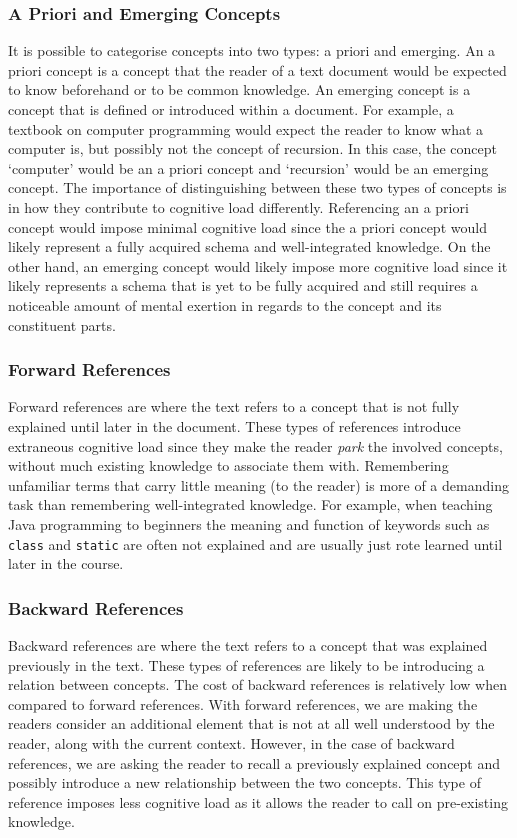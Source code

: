 \documentclass[12pt]{article}
\theoremstyle{grammarstyle}
\begin{document}
\subsubsection{A Priori and Emerging Concepts}
It is possible to categorise concepts into two types: a priori and emerging.
An a priori concept is a concept that the reader of a text document would be expected to know beforehand or to be common knowledge.
An emerging concept is a concept that is defined or introduced within a document.
For example, a textbook on computer programming would expect the reader to know what a computer is, but possibly not the concept of recursion. In this case, the concept `computer' would be an a priori concept and `recursion' would be an emerging concept.
The importance of distinguishing between these two types of concepts is in how they contribute to cognitive load differently. Referencing an a priori concept would impose minimal cognitive load since the a priori concept would likely represent a fully acquired schema and well-integrated knowledge. On the other hand, an emerging concept would likely impose more cognitive load since it likely represents a schema that is yet to be fully acquired and still requires a noticeable amount of mental exertion in regards to the concept and its constituent parts.

\subsubsection{Forward References}
Forward references are where the text refers to a concept that is not fully explained until later in the document. These types of references introduce extraneous cognitive load since they make the reader \textit{park} the involved concepts, without much existing knowledge to associate them with. Remembering unfamiliar terms that carry little meaning (to the reader) is more of a demanding task than remembering well-integrated knowledge. For example, when teaching Java programming to beginners the meaning and function of keywords such as \texttt{class} and \texttt{static} are often not explained and are usually just rote learned until later in the course.

\subsubsection{Backward References}
Backward references are where the text refers to a concept that was explained previously in the text. These types of references are likely to be introducing a relation between concepts. The cost of backward references is relatively low when compared to forward references. With forward references, we are making the readers consider an additional element that is not at all well understood by the reader, along with the current context. However, in the case of backward references, we are asking the reader to recall a previously explained concept and possibly introduce a new relationship between the two concepts. This type of reference imposes less cognitive load as it allows the reader to call on pre-existing knowledge.
\end{document}
